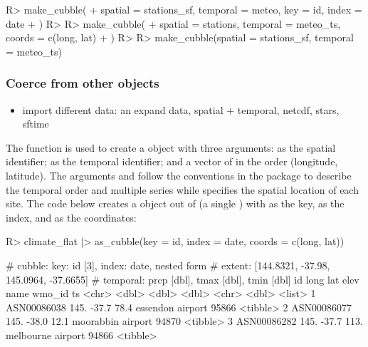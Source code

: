 \documentclass[
  shortnames]{jss}
\providecommand{\tightlist}{%
  \setlength{\itemsep}{0pt}\setlength{\parskip}{0pt}}
\begin{document}
\begin{CodeChunk}
\begin{CodeInput}
R> make_cubble(
+   spatial = stations_sf, temporal = meteo, key = id, index = date
+   )
R> 
R> make_cubble(
+   spatial = stations, temporal = meteo_ts, coords = c(long, lat)
+   )
R> 
R> make_cubble(spatial = stations_sf, temporal = meteo_ts)
\end{CodeInput}
\end{CodeChunk}

\hypertarget{coerce-from-other-objects}{%
\subsubsection{Coerce from other objects}\label{coerce-from-other-objects}}

\begin{itemize}
\tightlist
\item
  import different data: an expand data, spatial + temporal, netcdf, stars, sftime
\end{itemize}

The function  is used to create a  object with three arguments:  as the spatial identifier;  as the temporal identifier; and a vector of  in the order (longitude, latitude). The arguments  and  follow the conventions in the  package to describe the temporal order and multiple series while  specifies the spatial location of each site. The code below creates a  object out of  (a single ) with  as the key,  as the index, and  as the coordinates:

\begin{CodeChunk}
\begin{CodeInput}
R> climate_flat |> as_cubble(key = id, index = date, coords = c(long, lat))
\end{CodeInput}
\begin{CodeOutput}
# cubble:   key: id [3], index: date, nested form
# extent:   [144.8321, -37.98, 145.0964, -37.6655]
# temporal: prcp [dbl], tmax [dbl], tmin [dbl]
  id           long   lat  elev name              wmo_id ts      
  <chr>       <dbl> <dbl> <dbl> <chr>              <dbl> <list>  
1 ASN00086038  145. -37.7  78.4 essendon airport   95866 <tibble>
2 ASN00086077  145. -38.0  12.1 moorabbin airport  94870 <tibble>
3 ASN00086282  145. -37.7 113.  melbourne airport  94866 <tibble>
\end{CodeOutput}
\end{CodeChunk}
\end{document}
